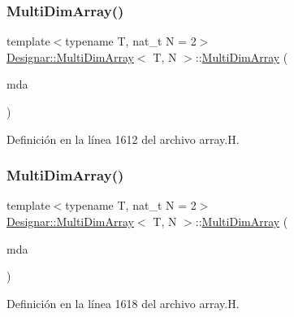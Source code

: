 \subsubsection{\texorpdfstring{Multi\+Dim\+Array()}{MultiDimArray()}\hspace{0.1cm}{\footnotesize\ttfamily [3/4]}}
{\footnotesize\ttfamily template$<$typename T, nat\+\_\+t N = 2$>$ \\
\hyperlink{class_designar_1_1_multi_dim_array}{Designar\+::\+Multi\+Dim\+Array}$<$ T, N $>$\+::\hyperlink{class_designar_1_1_multi_dim_array}{Multi\+Dim\+Array} (\begin{DoxyParamCaption}\item[{const \hyperlink{class_designar_1_1_multi_dim_array}{Multi\+Dim\+Array}$<$ T, N $>$ \&}]{mda }\end{DoxyParamCaption})\hspace{0.3cm}{\ttfamily [inline]}}



Definición en la línea 1612 del archivo array.\+H.

\mbox{\label{class_designar_1_1_multi_dim_array_aaa91d894b0e4065cba28a9066c0513b8}} 
\subsubsection{\texorpdfstring{Multi\+Dim\+Array()}{MultiDimArray()}\hspace{0.1cm}{\footnotesize\ttfamily [4/4]}}
{\footnotesize\ttfamily template$<$typename T, nat\+\_\+t N = 2$>$ \\
\hyperlink{class_designar_1_1_multi_dim_array}{Designar\+::\+Multi\+Dim\+Array}$<$ T, N $>$\+::\hyperlink{class_designar_1_1_multi_dim_array}{Multi\+Dim\+Array} (\begin{DoxyParamCaption}\item[{\hyperlink{class_designar_1_1_multi_dim_array}{Multi\+Dim\+Array}$<$ T, N $>$ \&\&}]{mda }\end{DoxyParamCaption})\hspace{0.3cm}{\ttfamily [inline]}}



Definición en la línea 1618 del archivo array.\+H.



